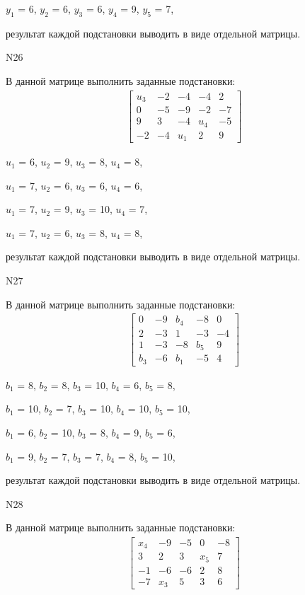 \documentclass[11pt]{report}
\begin{document}
$y_{1}$ = 6, $y_{2}$ = 6, $y_{3}$ = 6, $y_{4}$ = 9, $y_{5}$ = 7, 

результат каждой подстановки выводить в виде отдельной матрицы.

N26

В данной матрице выполнить заданные подстановки:
\begin{align*}
\left[\begin{matrix}u_{3} & -2 & -4 & -4 & 2\\0 & -5 & -9 & -2 & -7\\9 & 3 & -4 & u_{4} & -5\\-2 & -4 & u_{1} & 2 & 9\end{matrix}\right]
\end{align*}


$u_{1}$ = 6, $u_{2}$ = 9, $u_{3}$ = 8, $u_{4}$ = 8, 

$u_{1}$ = 7, $u_{2}$ = 6, $u_{3}$ = 6, $u_{4}$ = 6, 

$u_{1}$ = 7, $u_{2}$ = 9, $u_{3}$ = 10, $u_{4}$ = 7, 

$u_{1}$ = 7, $u_{2}$ = 6, $u_{3}$ = 8, $u_{4}$ = 8, 

результат каждой подстановки выводить в виде отдельной матрицы.

N27

В данной матрице выполнить заданные подстановки:
\begin{align*}
\left[\begin{matrix}0 & -9 & b_{4} & -8 & 0\\2 & -3 & 1 & -3 & -4\\1 & -3 & -8 & b_{5} & 9\\b_{3} & -6 & b_{1} & -5 & 4\end{matrix}\right]
\end{align*}


$b_{1}$ = 8, $b_{2}$ = 8, $b_{3}$ = 10, $b_{4}$ = 6, $b_{5}$ = 8, 

$b_{1}$ = 10, $b_{2}$ = 7, $b_{3}$ = 10, $b_{4}$ = 10, $b_{5}$ = 10, 

$b_{1}$ = 6, $b_{2}$ = 10, $b_{3}$ = 8, $b_{4}$ = 9, $b_{5}$ = 6, 

$b_{1}$ = 9, $b_{2}$ = 7, $b_{3}$ = 7, $b_{4}$ = 8, $b_{5}$ = 10, 

результат каждой подстановки выводить в виде отдельной матрицы.

N28

В данной матрице выполнить заданные подстановки:
\begin{align*}
\left[\begin{matrix}x_{4} & -9 & -5 & 0 & -8\\3 & 2 & 3 & x_{5} & 7\\-1 & -6 & -6 & 2 & 8\\-7 & x_{3} & 5 & 3 & 6\end{matrix}\right]
\end{align*}
\end{document}
